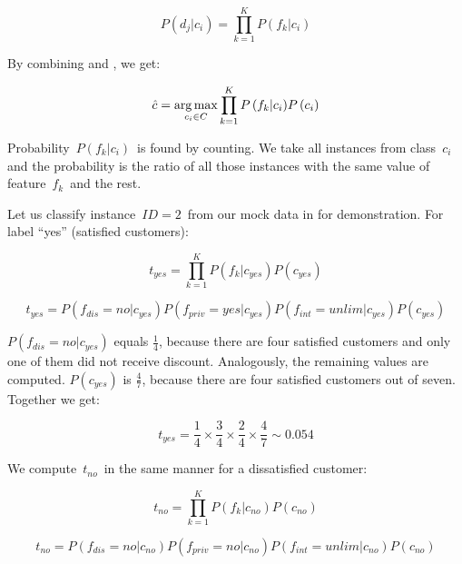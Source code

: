 \begin{equation}
	\label{eq:posterios}
	P\left(d_j  | c_i \right) = \prod_{k=1}^{K}
	{P\left(  f_k  | c_i \right)}
\end{equation}

By combining  and , we get:

\begin{equation}
	\hat{c} = \operatorname*{arg\,max}_{c_i \in C}
	\prod_{k=1}^{K}
	{P\left(  f_k  | c_i \right)}
	P\left( c_i \right)
\end{equation}

Probability~$P\left(f_k|c_i\right)$~is found by counting.
We take all instances from class~$c_i$ and the probability is the ratio of all those instances with the same value of feature~$f_k$~and the rest.

Let us classify instance~$\mathit{ID}=2$~from our mock data in  for demonstration.
For label ``yes'' (satisfied customers):

\begin{equation}
	t_{yes} = 
	\prod_{k=1}^{K}
	{P\left(  f_k  | c_{yes} \right)}
	P\left( c_{yes} \right)
\end{equation}

\begin{equation}
	t_{yes} = 
	P\left(  f_{dis} = no | c_{yes} \right)
	P\left(  f_{priv} = yes | c_{yes} \right)
	P\left(  f_{int} = unlim | c_{yes} \right)
	P\left( c_{yes} \right)
\end{equation}

$P\left(  f_{dis} = no | c_{yes} \right)$ equals $\frac{1}{4}$, because there are four satisfied customers
and only one of them did not receive discount.
Analogously, the remaining values are computed.
$P\left( c_{yes} \right)$ is $\frac{4}{7}$, because there are four satisfied customers out of seven.
Together we get:

\begin{equation}
	t_{yes} = 
	\frac{1}{4} \times
	\frac{3}{4} \times
	\frac{2}{4} \times
	\frac{4}{7}
	\sim 0.054
\end{equation}

We compute~$t_{no}$~in the same manner for a dissatisfied customer:

\begin{equation}
	t_{no} = 
	\prod_{k=1}^{K}
	{P\left(  f_k  | c_{no} \right)}
	P\left( c_{no} \right)
\end{equation}

\begin{equation}
	t_{no} = 
	P\left(  f_{dis} = no | c_{no} \right)
	P\left(  f_{priv} = no | c_{no} \right)
	P\left(  f_{int} = unlim | c_{no} \right)
	P\left( c_{no} \right)
\end{equation}

